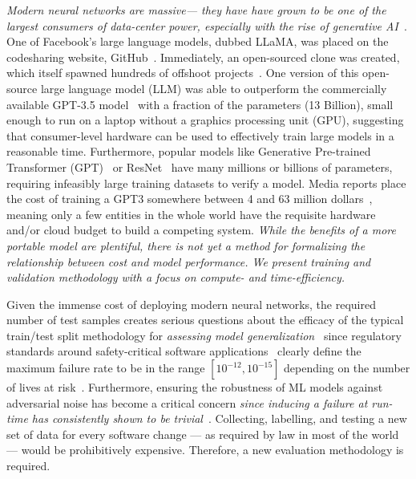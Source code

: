 \documentclass[conference]{IEEEtran}
\newcommand{\cm}[1]{\textit{{\color{blue}#1}}}
\begin{document}
\cm{Modern neural networks are massive--- they have have grown to be one of the largest consumers of data-center power, especially with the rise of generative AI~\cite{msft_water}}.
One of Facebook's large language models, dubbed LLaMA, was placed on the codesharing website, GitHub~\cite{llama}. Immediately, an open-sourced clone was created, which itself spawned hundreds of offshoot projects~\cite{openllama}. One version of this open-source large language model (LLM) was able to outperform the commercially available GPT-3.5 model~\cite{liu2023goat} with a fraction of the parameters (13 Billion), small enough to run on a laptop without a graphics processing unit (GPU), suggesting that consumer-level hardware can be used to effectively train large models in a reasonable time. Furthermore, popular models like Generative Pre-trained Transformer (GPT)~\cite{floridi2020gpt} or ResNet~\cite{resnet} have many millions or billions of parameters, requiring infeasibly large training datasets to verify a model\cite{vcdimension}. Media reports place the cost of training a GPT3 somewhere between 4 and 63 million dollars~\cite{Patel_Ahmad_2023,Feswing_2023}, meaning only a few entities in the whole world have the requisite hardware and/or cloud budget to build a competing system. \cm{While the benefits of a more portable model are plentiful, there is not yet a method for formalizing the relationship between cost and model performance. We present training and validation methodology with a focus on compute- and time-efficiency.}

Given the immense cost of deploying modern neural networks, the required number of test samples creates serious questions about the efficacy of the typical train/test split methodology for \cm{assessing model generalization}~\cite{meyers} since regulatory standards around safety-critical software applications~\cite{IEC61508,iso26262,aviation_software,safetyframework} clearly define the maximum failure rate to be in the range $[10^{-12}, 10^{-15}]$ depending on the number of lives at risk~\cite{iso26262}. Furthermore, ensuring the robustness of ML models against adversarial noise has become a critical concern \cm{since inducing a failure at run-time has consistently shown to be trivial}~\cite{adversarialpatch, carlini_towards_2017, croce_reliable_2020, hopskipjump, chakraborty2018adversarial, art2018}. Collecting, labelling, and testing a new set of data for every software change --- as required by law in most of the world~\cite{IEC61508,iso26262,aviation_software,safetyframework} --- would be prohibitively expensive. Therefore, a new evaluation methodology is required.
\end{document}
